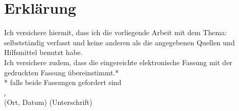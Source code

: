 \section*{Erklärung}
Ich versichere hiermit, dass ich die vorliegende Arbeit mit dem Thema: \emph{\thetitle} selbstständig verfasst und keine anderen als die angegebenen Quellen und Hilfsmittel benutzt habe. \\

Ich versichere zudem, dass die eingereichte elektronische Fassung mit der gedruckten Fassung übereinstimmt.* \\

* falls beide Fassungen gefordert sind
$\;$ \\
$\;$ \\
$\;$ \\
$\;$ \\
$\;$ \\
\underline{\universityCity, \dayOfCompletion \hspace{5mm}} \hspace{55mm} 
\underline{\hspace{50mm}} \\

(Ort, Datum) \hspace{75mm} (Unterschrift)
